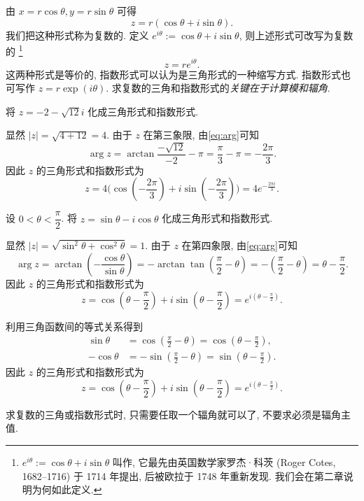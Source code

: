 由 $x=r\cos\theta,y=r\sin\theta$ 可得
  \[z=r(\cos\theta+i\sin\theta).\]
我们把这种形式称为复数的.
定义 \emph{$e^{i\theta}:=\cos\theta+i\sin\theta$}, 则上述形式可改写为复数的%
  \footnote{%
    $e^{i\theta}:=\cos\theta+i\sin\theta$ 叫作, 它最先由英国数学家罗杰·科茨 (Roger Cotes, 1682--1716) 于 1714 年提出\cite{Cotes1714}, 后被欧拉于 1748 年重新发现.
    我们会在第二章说明为何如此定义.
  }%
  \[z=re^{i\theta}.\]
这两种形式是等价的, 指数形式可以认为是三角形式的一种缩写方式.
指数形式也可写作 $z=r\exp(i\theta)$.
求复数的三角和指数形式的\emph{关键在于计算模和辐角}.

\begin{example}
  将 $z=-2-\sqrt{12}i$ 化成三角形式和指数形式.
\end{example}

\begin{solution}
  显然 $|z|=\sqrt{4+12}=4$.
  由于 $z$ 在第三象限, 由\ref{eq:arg}可知
    \[\arg z=\arctan\frac{-\sqrt{12}}{-2}-\pi=\frac\pi3-\pi=-\frac{2\pi}3.\]
  因此 $z$ 的三角形式和指数形式为
    \[z=4\bigl(\cos(-\frac{2\pi}3)+i\sin(-
    \frac{2\pi}3)\bigr)=4e^{-\frac{2\pi i}3}.\]
\end{solution}

\begin{example}
  设 $0<\theta<\dfrac\pi2$. 将 $z=\sin\theta-i\cos\theta$ 化成三角形式和指数形式.
\end{example}
\begin{solution}
  显然 $|z|=\sqrt{\sin^2\theta+\cos^2\theta}=1$. 由于 $z$ 在第四象限, 由\ref{eq:arg}可知
  \[\arg z=\arctan(-\frac{\cos\theta}{\sin\theta})=-\arctan\tan(\frac\pi2-\theta)=-(\frac\pi2-\theta)=\theta-\frac\pi2.\]
  因此 $z$ 的三角形式和指数形式为
  \[z=\displaystyle\cos(\theta-\frac\pi2)+i\sin(\theta-\frac\pi2)=e^{i(\theta-\frac\pi2)}.\]
\end{solution}
\begin{solution}[另解]
  利用三角函数间的等式关系得到
  \begin{align*}
    \sin\theta&=\cos(\frac\pi2-\theta)=\cos(\theta-\frac\pi2),\\
    -\cos\theta&=-\sin(\frac\pi2-\theta)=\sin(\theta-\frac\pi2).
  \end{align*}
  因此 $z$ 的三角形式和指数形式为
  \[z=\displaystyle\cos(\theta-\frac\pi2)+i\sin(\theta-\frac\pi2)=e^{i(\theta-\frac\pi2)}.\]
\end{solution}

求复数的三角或指数形式时, 只需要任取一个辐角就可以了, 不要求必须是辐角主值.

